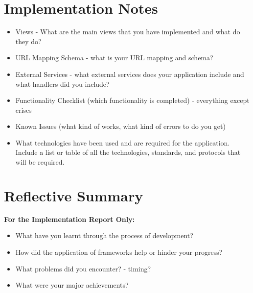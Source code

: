\documentclass{sig-alt-release2}
\begin{document}
\section{Implementation Notes}

\begin{itemize}

\item Views - What are the main views that you have implemented and what do they do?



\item URL Mapping Schema - what is your URL mapping and schema?

\item External Services  - what external services does your application include and what handlers did you include?

\item	Functionality Checklist (which functionality is completed) - everything except crises 

\item	Known Issues (what kind of works, what kind of errors to do you get)

\item What technologies have been used and are required for the application. Include a list or table of all the technologies, standards, and protocols that will be required.
\end{itemize}

\section{Reflective Summary}
{\bf For the Implementation Report Only:}
\begin{itemize}

\item	What have you learnt through the process of development? 

\item	How did the application of frameworks help or hinder your progress? 

\item	What problems did you encounter? - timing?

\item	What were your major achievements?
\end{itemize}
\end{document}
